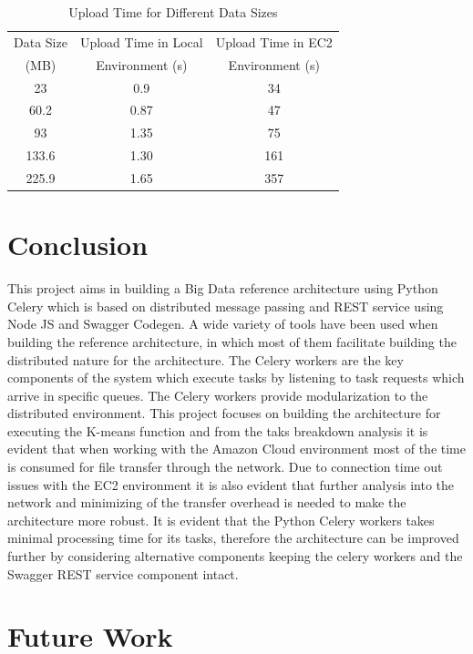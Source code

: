 \begin{table}[htbp]
	\centering
	\caption{Upload Time for Different Data 
	Sizes}\label{tbl:datasizestimebreakdown}
	\begin{tabular}{*{3}{c}}
		\toprule
		Data Size & Upload Time in Local & Upload Time in EC2 \\
		(MB) & Environment (s) & Environment (s) \\
		\midrule
		23    &   0.9    &  34  \\ \midrule
		60.2  &   0.87   &  47  \\ \midrule
		93    &   1.35   &  75  \\ \midrule
		133.6 &   1.30   &  161 \\ \midrule
		225.9 &   1.65   &  357 \\
		\bottomrule
	\end{tabular}
\end{table}

\section{Conclusion}

This project aims in building a Big Data reference architecture using Python 
Celery which is based on distributed message passing and REST service using 
Node JS and Swagger Codegen. A wide variety of tools have been used when 
building the reference architecture, in which most of them facilitate building 
the distributed nature for the architecture. The Celery workers are the key 
components of the system which execute tasks by listening to task requests 
which arrive in specific queues. The Celery workers provide modularization to 
the distributed environment. This project focuses on building the 
architecture for executing the K-means function and from the taks breakdown 
analysis it is evident that when working with the Amazon Cloud environment 
most of the time is consumed for file transfer through the network. Due to 
connection time out issues with the EC2 environment it is also evident that 
further analysis into the network and minimizing of the transfer overhead is 
needed to make the architecture more robust. It is evident that the Python 
Celery workers takes minimal processing time for its tasks, therefore the 
architecture can be improved further by considering alternative components 
keeping the celery workers and the Swagger REST service component intact.
 
\section{Future Work}


